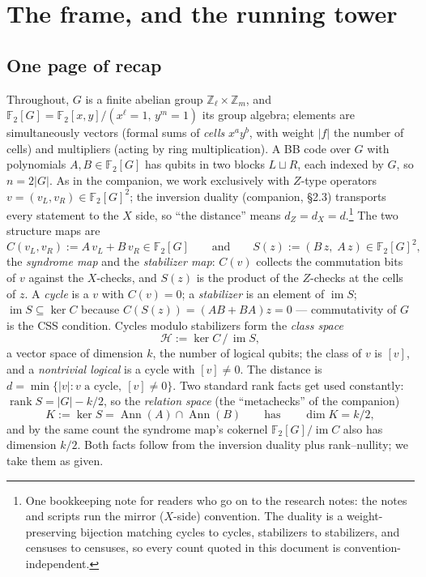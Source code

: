 \documentclass[11pt]{article}
\theoremstyle{plain}
\theoremstyle{definition}
\theoremstyle{remark}
\newcommand{\F}{\mathbb{F}}
\newcommand{\Z}{\mathbb{Z}}
\newcommand{\Ann}{\operatorname{Ann}}
\newcommand{\clH}{\mathcal{H}}
\newcommand{\wt}[1]{\lvert #1\rvert}
\begin{document}
\section{The frame, and the running tower}
\label{sec:frame}

\subsection{One page of recap}
\label{sec:recap}

Throughout, $G$ is a finite abelian group $\Z_\ell \times \Z_m$, and
$\F_2[G] = \F_2[x,y]/(x^\ell{=}1,\, y^m{=}1)$ its group algebra; elements
are simultaneously vectors (formal sums of \emph{cells} $x^ay^b$, with
weight $\wt{f}$ the number of cells) and multipliers (acting by ring
multiplication). A BB code over $G$ with polynomials $A, B \in \F_2[G]$
has qubits in two blocks $L \sqcup R$, each indexed by $G$, so
$n = 2\lvert G \rvert$. As in the companion, we work exclusively with
$Z$-type operators $v = (v_L, v_R) \in \F_2[G]^2$; the inversion duality
(companion, \S2.3) transports every statement to the $X$ side, so ``the
distance'' means $d_Z = d_X = d$.\footnote{One bookkeeping note for
readers who go on to the research notes: the notes and scripts run the
mirror ($X$-side) convention. The duality is a weight-preserving bijection
matching cycles to cycles, stabilizers to stabilizers, and censuses to
censuses, so every count quoted in this document is convention-independent.}
The two structure maps are
\[
C(v_L, v_R) := A\,v_L + B\,v_R \in \F_2[G]
\qquad\text{and}\qquad
S(z) := (B\,z,\; A\,z) \in \F_2[G]^2 ,
\]
the \emph{syndrome map} and the \emph{stabilizer map}: $C(v)$ collects the
commutation bits of $v$ against the $X$-checks, and $S(z)$ is the product
of the $Z$-checks at the cells of $z$. A \emph{cycle} is a $v$ with
$C(v) = 0$; a \emph{stabilizer} is an element of $\operatorname{im} S$;
$\operatorname{im} S \subseteq \ker C$ because $C(S(z)) = (AB + BA)z = 0$
--- commutativity of $G$ is the CSS condition. Cycles modulo stabilizers
form the \emph{class space}
\[
\clH := \ker C \,/\, \operatorname{im} S,
\]
a vector space of dimension $k$, the number of logical qubits; the class
of $v$ is $[v]$, and a \emph{nontrivial logical} is a cycle with
$[v] \neq 0$. The distance is
$d = \min\{\wt{v} : v \text{ a cycle},\ [v] \neq 0\}$. Two standard rank
facts get used constantly: $\operatorname{rank} S = \lvert G\rvert - k/2$,
so the \emph{relation space} (the ``metachecks'' of the companion)
\[
K := \ker S = \Ann(A) \cap \Ann(B)
\qquad\text{has}\qquad \dim K = k/2 ,
\]
and by the same count the syndrome map's cokernel $\F_2[G] /
\operatorname{im} C$ also has dimension $k/2$. Both facts follow from the
inversion duality plus rank--nullity; we take them as given.
\end{document}
